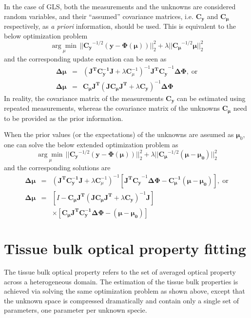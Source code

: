 \documentclass[12pt]{book}               %
\begin{document}
In the case of GLS, both the measurements and the unknowns are considered random variables, and their ``assumed'' covariance matrices, i.e. $\mathbf{C_y}$ and $\mathbf{C_\mu}$ respectively, as \emph{a priori} information, should be used. This is equivalent to the below optimization problem
\begin{equation}
\underset{\mu}{\arg\min} \, || \mathbf{C_y}^{-1/2}\left(\boldsymbol{y-\Phi(\mu)}\right) ||^2_2 + \lambda|| \mathbf{C_\mu}^{-1/2}\boldsymbol{\mu} ||^2_2
\end{equation}
and the corresponding update equation can be seen as
\begin{eqnarray}
\mathbf{\Delta\mu}&=&(\mathbf{J^TC_y^{-1}J}+\lambda \mathbf{C}_\mu^{-1})^{-1}\mathbf{J^TC_y}^{-1}\mathbf{\Delta\Phi},\;\mathrm{or}\label{eq:overgls}\\
\mathbf{\Delta\mu}&=&\mathbf{C_\mu J^T}(\mathbf{JC_\mu J^T}+\lambda \mathbf{C_y})^{-1}\mathbf{\Delta\Phi}\label{eq:undergls}
\end{eqnarray}
In reality, the covariance matrix of the measurements $\mathbf{C_y}$ can be estimated using repeated measurements, whereas the covariance matrix of the unknowns $\mathbf{C_\mu}$ need to be provided as the prior information.

When the prior values (or the expectations) of the unknowns are assumed as $\boldsymbol\mu_0$, one can solve the below extended optimization problem as
\begin{equation}\label{eq:objfunglsprior}
\underset{\mu}{\arg\min} \, || \mathbf{C_y}^{-1/2}\left(\boldsymbol{y-\Phi(\mu)}\right) ||^2_2 + \lambda|| \mathbf{C_\mu}^{-1/2}(\boldsymbol{\mu-\mu_0}) ||^2_2
\end{equation}
and the corresponding solutions are
\begin{eqnarray}
\mathbf{\Delta\mu}&=&(\mathbf{J^TC_y^{-1}J}+\lambda \mathbf{C}_\mu^{-1})^{-1}\left[\mathbf{J^TC_y}^{-1}\mathbf{\Delta\Phi} - \boldsymbol{C_\mu^{-1}(\mu-\mu_0)}\right],\;\mathrm{or}\label{eq:overglsprior}\\\nonumber
\mathbf{\Delta\mu}&=&\left[ I - \mathbf{C_\mu J^T}(\mathbf{JC_\mu J^T}+\lambda \mathbf{C_y})^{-1}\mathbf{J}\right] \\
 && \times\left[\mathbf{C_\mu J^TC_y^{-1}\Delta\Phi} - \boldsymbol{(\mu - \mu_0)}\right]\label{eq:underglsprior}
\end{eqnarray}

\section{Tissue bulk optical property fitting}\label{sec:bulkfitting}
The tissue bulk optical property refers to the set of averaged optical property across a heterogeneous domain. The estimation of the tissue bulk properties is achieved via solving the same optimization problem as shown above, except that the unknown space is compressed dramatically and contain only a single set of parameters, one parameter per unknown specie. 
\end{document}
